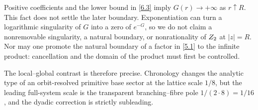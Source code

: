 Positive coefficients and the lower bound in \eqref{6.3} imply
\(G(r)\to+\infty\) as \(r\uparrow R\).  This fact does not settle the later
boundary.  Exponentiation can turn a logarithmic singularity of \(G\) into a
zero of \(e^{-G}\), so we do not claim a nonremovable singularity, a natural
boundary, or nonrationality of \(Z_{2}\) at \(|z|=R\).  Nor may one promote
the natural boundary of a factor in \eqref{5.1} to the infinite product:
cancellation and the domain of the product must first be controlled.

The local--global contrast is therefore precise.  Chronology changes the
analytic type of an orbit-resolved primitive base sector at the lattice scale
\(1/8\), but the leading full-system scale is the transparent branching--fibre
pole \(1/(2\cdot8)=1/16\), and the dyadic correction is strictly subleading.
